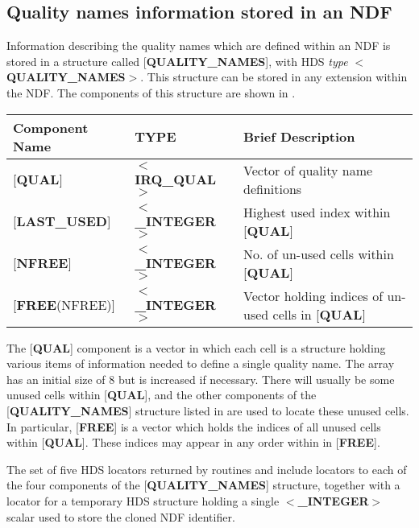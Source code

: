 \documentclass[twoside,11pt,nolof]{starlink}
\begin{document}
\subsection{Quality names information stored in an NDF}

Information describing the quality names which are defined within an
NDF is stored in a structure called {[}\textbf{QUALITY\_NAMES}{]}, with
HDS \emph{type} $<$\textbf{QUALITY\_NAMES}$>$. This structure can be
stored in any extension within the NDF. The components of this
structure are shown in .

\begin{table}[htb]
\centering
{}
\label{TAB:QN}
\begin{tabular}{|l|l|l|}
\hline
Component Name & TYPE & Brief Description \\ \hline
{[}\textbf{QUAL}{]} & $<$\textbf{IRQ\_QUAL}$>$ & Vector of quality name definitions\\
{[}\textbf{LAST\_USED}{]} & $<$\textbf{\_INTEGER}$>$ & Highest used index within
{[}\textbf{QUAL}{]}\\
{[}\textbf{NFREE}{]} & $<$\textbf{\_INTEGER}$>$ & No. of un-used cells within
{[}\textbf{QUAL}{]}\\
{[}\textbf{FREE}(NFREE){]} & $<$\textbf{\_INTEGER}$>$ & Vector holding indices of
un-used cells in {[}\textbf{QUAL}{]}\\
\hline
\end{tabular}
\end{table}

The {[}\textbf{QUAL}{]} component is a vector in which each cell is a
structure holding various items of information needed to define a
single quality name. The array has an initial size of 8 but is
increased if necessary. There will usually be some unused cells within
{[}\textbf{QUAL}{]}, and the other components of the {[}\textbf{QUALITY\_NAMES}{]} structure listed in  are used to locate these unused cells. In
particular, {[}\textbf{FREE}{]} is a vector which holds the indices of
all unused cells within {[}\textbf{QUAL}{]}. These indices may appear in
any order within in {[}\textbf{FREE}{]}.

The set of five HDS locators returned by routines
 and  include
locators to each of the four components of the {[}\textbf{QUALITY\_NAMES}{]} structure, together with a locator for a temporary
HDS structure holding a single $<$\textbf{\_INTEGER}$>$ scalar used to
store the cloned NDF identifier.
\end{document}
